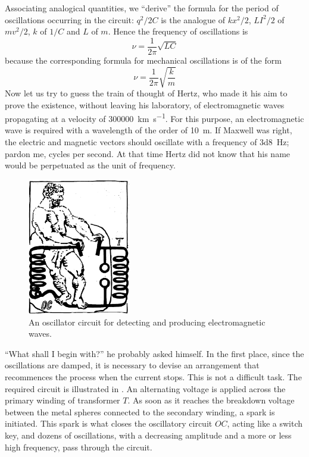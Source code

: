 Associating analogical quantities, we ``derive'' the formula for the period of oscillations occurring in the circuit: $q^{2}/2C$ is the analogue of $kx^{2}/2$, $LI^{2}/2$ of $mv^{2}/2$, $k$ of $1/C$ and $L$ of $m$. Hence the frequency of oscillations is 
\begin{equation*}%
\nu = \frac{1}{2\pi} \sqrt{LC}
\end{equation*}
because the corresponding formula for mechanical oscillations is of the form
\begin{equation*}%
\nu = \frac{1}{2\pi} \sqrt{\frac{k}{m}}
\end{equation*}
Now let us try to guess the train of thought of Hertz, who made it his aim to prove the existence, without leaving his laboratory, of electromagnetic waves propagating at a velocity of \SI{300000}{\kilo\meter\per\second}. For this purpose, an electromagnetic wave is required with a wavelength of the order of \SI{10}{\meter}. If Maxwell was right, the electric and magnetic vectors should oscillate with a frequency of \SI{3d8}{\hertz}; pardon me, cycles per second. At that time Hertz did not know that his name would be perpetuated as the unit of frequency.

\begin{figure}[!ht]
\centering
\includegraphics[width=0.4\textwidth]{figures/fig-05-06.pdf}
\caption{An oscillator circuit for detecting and producing electromagnetic waves.}
\label{fig-5.6}
\end{figure}

``What shall I begin with?'' he probably asked himself. In the first place, since the oscillations are damped, it is necessary to devise an arrangement that recommences the process when the current stops. This is not a difficult task. The required circuit is illustrated in . An alternating voltage is applied across the primary winding of transformer $T$. As soon as it reaches the breakdown voltage between the metal spheres connected to the secondary winding, a spark is initiated. This spark is what closes the oscillatory circuit $OC$, acting like a switch key, and dozens of oscillations, with a decreasing amplitude and a more or less high frequency, pass through the circuit.

